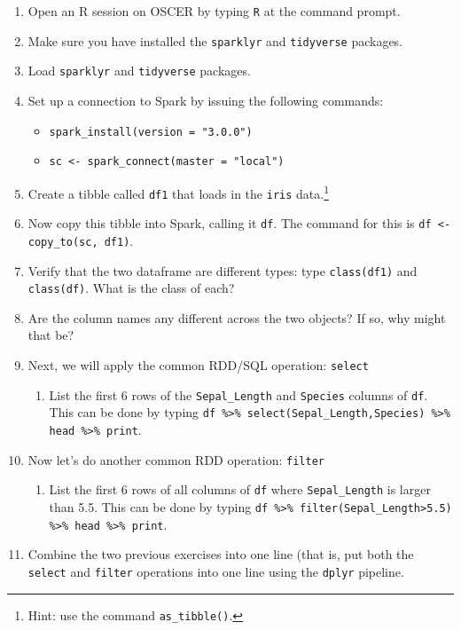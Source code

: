 \documentclass[12pt,english]{exam}
\begin{document}
\begin{questions}
\begin{enumerate}
    \item Open an R session on OSCER by typing \texttt{R} at the command prompt.
    \item Make sure you have installed the \texttt{sparklyr} and \texttt{tidyverse} packages.
    \item Load \texttt{sparklyr} and \texttt{tidyverse} packages. 
    \item Set up a connection to Spark by issuing the following commands:
    \begin{itemize}
        \item[] \texttt{spark\_install(version = "3.0.0")}
        \item[] \texttt{sc <- spark\_connect(master = "local")}
    \end{itemize}
    \item Create a tibble called \texttt{df1} that loads in the \texttt{iris} data.\footnote{Hint: use the command \texttt{as\_tibble()}.}
    \item Now copy this tibble into Spark, calling it \texttt{df}. The command for this is \texttt{df  <- copy\_to(sc, df1)}.
    \item Verify that the two dataframe are different types: type \texttt{class(df1)} and \texttt{class(df)}. What is the class of each?
    \item Are the column names any different across the two objects? If so, why might that be?
    \item Next, we will apply the common RDD/SQL operation: \texttt{select}
    \begin{enumerate}
        \item List the first 6 rows of the \texttt{Sepal\_Length} and \texttt{Species} columns of \texttt{df}. This can be done by typing \texttt{df  \%>\% select(Sepal\_Length,Species) \%>\% head \%>\% print}.
    \end{enumerate}
    \item Now let's do another common RDD operation: \texttt{filter} 
    \begin{enumerate}
         \item List the first 6 rows of all columns of \texttt{df} where \texttt{Sepal\_Length} is larger than 5.5. This can be done by typing \texttt{df  \%>\% filter(Sepal\_Length>5.5) \%>\% head \%>\% print}.
    \end{enumerate}
    \item Combine the two previous exercises into one line (that is, put both the \texttt{select} and \texttt{filter} operations into one line using the \texttt{dplyr} pipeline.

\end{enumerate}
\end{questions}
\end{document}
